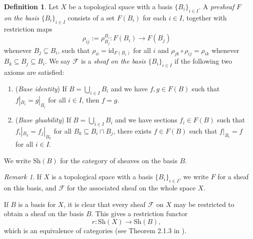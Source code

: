 \documentclass[10pt,oneside]{book}
\def\~#1{\mathscr{#1}}
\newcommand{\Sh}{\mathrm{Sh}}
\newcommand{\id}{\mathrm{id}}
\theoremstyle{plain}
\theoremstyle{definition}
\newtheorem{defn}[thm]{Definition}
\theoremstyle{remark}
\newtheorem*{rmk}{Remark}
\numberwithin{equation}{section}
\numberwithin{figure}{section}
\begin{document}
\begin{defn}
    Let $X$ be a topological space with a basis $\{B_i\}_{i\in I}$. A \emph{presheaf} $F$ \emph{on the basis $\{B_i\}_{i\in I}$} consists of a set $F(B_i)$ for each $i\in I$, together with restriction maps
    \[\rho_{ij} := \rho^{B_i}_{B_j}: F(B_i) \to F(B_j)\]
    whenever $B_j \subseteq B_i$, such that $\rho_{ii} = \id_{F(B_i)}$ for all $i$ and $\rho_{jk} \circ \rho_{ij} = \rho_{ik}$ whenever $B_k \subseteq B_j \subseteq B_i$. We say $\~F$ is a \emph{sheaf on the basis $\{B_i\}_{i\in I}$} if the following two axioms are satisfied:
    \begin{enumerate}[label=(\roman*)]
        \item (\emph{Base identity}) If $B = \bigcup_{i \in I}B_i$ and we have $f, g \in F(B)$ such that $f|_{B_i} = g|_{B_i}$ for all $i \in I$, then $f = g$.
        \item (\emph{Base gluability}) If $B = \bigcup_{i \in I} B_i$ and we have sections $f_i \in F(B)$ such that $f_i|_{B_k} = f_j|_{B_k}$ for all $B_k \subseteq B_i \cap B_j$, there exists $f \in F(B)$ such that $f|_{B_i} = f$ for all $i \in I$.
    \end{enumerate}
    We write $\Sh(B)$ for the category of sheaves on the basis $B$.
\end{defn}

\begin{rmk}
    If $X$ is a topological space with a basis $\{B_i\}_{i \in I}$, we write $F$ for a sheaf on this basis, and $\~F$ for the associated sheaf on the whole space $X$. 
\end{rmk}

If $B$ is a basis for $X$, it is clear that every sheaf $\~F$ on $X$ may be restricted to obtain a sheaf on the basis $B$. This gives a restriction functor
\[r: \Sh(X) \to \Sh(B),\]
which is an equivalence of categories (see Theorem 2.1.3 in \cite{SGL}).
\end{document}
